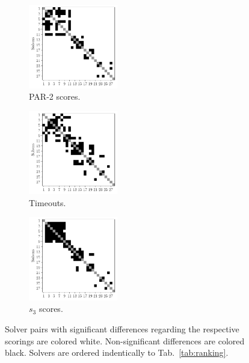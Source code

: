 \documentclass[sn-basic, Numbered]{sn-jnl} %
\begin{document}
\begin{figure}[tbp]
  \centering
  \begin{subfigure}{0.32\textwidth}
    \centering
    \includegraphics[width=3.9cm]{../plots/par2sigdiff.pdf}
    \caption{PAR-2 scores.}
  \end{subfigure}
  \begin{subfigure}{0.32\textwidth}
    \centering
    \includegraphics[width=3.9cm]{../plots/timeoutsigdiff.pdf}
    \caption{Timeouts.}
  \end{subfigure}
  \begin{subfigure}{0.32\textwidth}
    \centering
    \includegraphics[width=3.9cm]{../plots/s3sigdiff.pdf}
    \caption{$s_3$ scores.}
  \end{subfigure}
  \caption{Solver pairs with significant differences regarding the respective scorings are colored white. Non-significant differences are colored black. Solvers are ordered indentically to Tab.~\ref{tab:ranking}.}
\end{figure}

\end{document}
